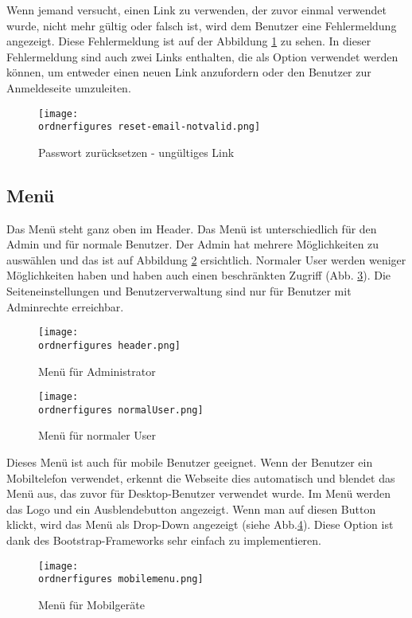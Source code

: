 Wenn jemand versucht, einen Link zu verwenden, der zuvor einmal verwendet wurde, nicht mehr gültig oder falsch ist, wird dem Benutzer eine Fehlermeldung angezeigt. Diese Fehlermeldung ist auf der Abbildung \ref{fi:invalidlink} zu sehen. In dieser Fehlermeldung sind auch zwei Links enthalten, die als Option verwendet werden können, um entweder einen neuen Link anzufordern oder den Benutzer zur Anmeldeseite umzuleiten.



\begin{figure}[H]
	\centering
	\texttt{[image: \\ordnerfigures reset-email-notvalid.png]}
	\caption{Passwort zurücksetzen - ungültiges Link}
	\label{fi:invalidlink}
\end{figure}


\subsection{Menü}

Das Menü steht ganz oben im Header. Das Menü ist unterschiedlich für den Admin und für normale Benutzer. Der Admin hat mehrere Möglichkeiten zu auswählen und das ist auf Abbildung \ref{fi:menu} ersichtlich. Normaler User werden weniger Möglichkeiten haben und haben auch einen beschränkten Zugriff (Abb. \ref{fi:normalerUser}). Die Seiteneinstellungen und Benutzerverwaltung sind nur für Benutzer mit Adminrechte erreichbar. 

\begin{figure}[H]
	\centering
	\texttt{[image: \\ordnerfigures header.png]}
	\caption{Men\"u für Administrator}
	\label{fi:menu}
\end{figure}

\begin{figure}[H]
	\centering
	\texttt{[image: \\ordnerfigures normalUser.png]}
	\caption{Men\"u für normaler User}
	\label{fi:normalerUser}
\end{figure}

Dieses Menü ist auch für mobile Benutzer geeignet. Wenn der Benutzer ein Mobiltelefon verwendet, erkennt die Webseite dies automatisch und blendet das Menü aus, das zuvor für Desktop-Benutzer verwendet wurde. Im Menü werden das Logo und ein Ausblendebutton angezeigt. Wenn man auf diesen Button klickt, wird das Menü als Drop-Down angezeigt (siehe Abb.\ref{fi:mobilemenu}). Diese Option ist dank des Bootstrap-Frameworks sehr einfach zu implementieren.
	
\begin{figure}[H]
	\centering
	\texttt{[image: \\ordnerfigures mobilemenu.png]}
	\caption{Men\"u für Mobilgeräte}
	\label{fi:mobilemenu}
\end{figure}

